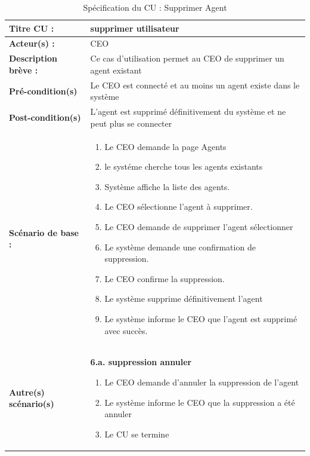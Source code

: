 \begin{table}[H]
\begin{tabularx}{\textwidth}{|l|X|}
\hline
\textbf{Titre CU :} & supprimer utilisateur \\
\hline
\textbf{Acteur(s) :} & CEO \\
\hline
\textbf{Description brève :} & Ce cas d'utilisation permet au CEO de supprimer un agent existant \\
\hline
\textbf{Pré-condition(s)} & Le CEO est connecté et au moins un agent existe dans le système \\
\hline
\textbf{Post-condition(s)} & L'agent est supprimé définitivement du système et ne peut plus se connecter \\
\hline
\textbf{Scénario de base :} &
\begin{enumerate}[leftmargin=1.5em, topsep=2pt, itemsep=1pt]
  \item Le CEO demande la page Agents
  \item le systéme cherche tous les agents existants
  \item Système affiche la liste des agents.
  \item Le CEO sélectionne l'agent à supprimer.
  \item Le CEO demande de supprimer l'agent sélectionner
  \item Le système demande une confirmation de suppression.
  \item Le CEO confirme la suppression.
  \item Le système supprime définitivement l'agent
  \item Le système informe le CEO que l'agent est supprimé avec succès.
\end{enumerate} \\
\hline
\textbf{Autre(s) scénario(s)} &
\textbf{6.a. suppression annuler}
\begin{enumerate}[leftmargin=1.5em, topsep=2pt, itemsep=1pt]
  \item Le CEO demande d'annuler la suppression de l'agent
  \item Le système informe le CEO que la suppression a été annuler
  \item Le CU se termine
\end{enumerate} \\
\hline
\end{tabularx}
\caption{Spécification du CU : Supprimer Agent}
\label{tab:cu-supprimer-agent}
\end{table}

\clearpage

